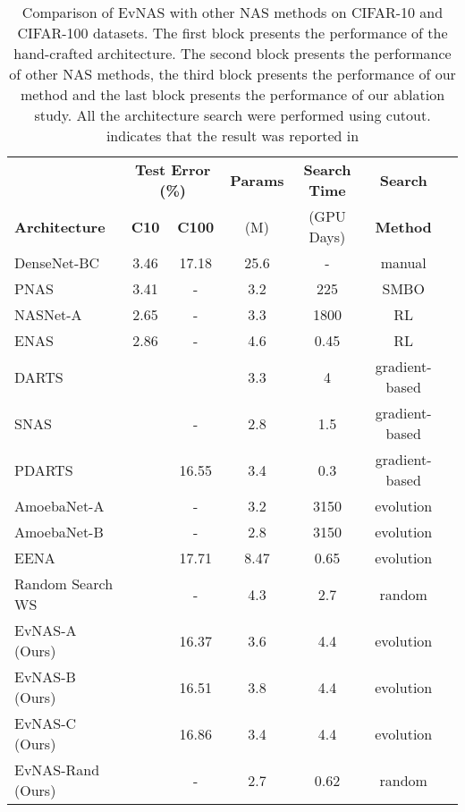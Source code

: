 \documentclass[final]{cvpr}
\begin{document}
\begin{table*}[t]
    \caption{Comparison of EvNAS with other NAS methods on CIFAR-10 and CIFAR-100 datasets. The
    first block presents the performance of the hand-crafted architecture. The second block
    presents the performance of other NAS methods, the third block presents the performance of our
    method and the last block presents the performance of our ablation study. All the architecture
    search were performed using cutout.  indicates that the result was reported in
    \cite{chen2019progressive}}
    \label{table:CIFAR10}
    \centering
    \begin{tabular}{lcccccc}
\hline
     & \multicolumn{2}{c}{\bf{Test Error (\%)}} & \bf{Params} & \bf{Search Time} &\bf{Search} \\
    \bf{Architecture} & \bf{C10} & \bf{C100} & (M) & (GPU Days) & \bf{Method} \\
\hline
    DenseNet-BC         \cite{huang2017densely}  & 3.46 & 17.18   & 25.6 & - & manual\\
    \hline
    PNAS            \cite{liu2018progressive}  &3.41 & - & 3.2 & 225 & SMBO\\
    NASNet-A   \cite{zoph2018learning}     & 2.65 & -     & 3.3  &1800& RL\\
    ENAS       \cite{pmlr-v80-pham18a}    & 2.86 & -       & 4.6  &0.45& RL\\
    DARTS      \cite{liu2018darts2} &  &  & 3.3 &4& gradient-based\\
    SNAS       \cite{xie2018snas}          &  & - & 2.8&1.5& gradient-based\\
    PDARTS     \cite{chen2019progressive}  &  & 16.55        & 3.4 & 0.3 & gradient-based\\
    AmoebaNet-A\cite{real2019regularized}  &  & - & 3.2 &3150& evolution\\
    AmoebaNet-B\cite{real2019regularized}  &  & - & 2.8 &3150& evolution\\
    EENA       \cite{zhu2019eena}          &  & 17.71 & 8.47 & 0.65 & evolution\\
    Random Search WS\cite{li2019random}         &  & - & 4.3 &2.7& random\\
    \hline
    EvNAS-A (Ours)                       &  & 16.37 & 3.6 & 4.4 & evolution\\
    EvNAS-B (Ours)                       &  & 16.51 & 3.8 & 4.4 & evolution\\
    EvNAS-C (Ours)                       &  & 16.86 & 3.4 & 4.4 & evolution\\
    \hline
    EvNAS-Rand (Ours)                       &  & - & 2.7 &0.62& random\\
    

\end{tabular}
\end{table*}
\end{document}
